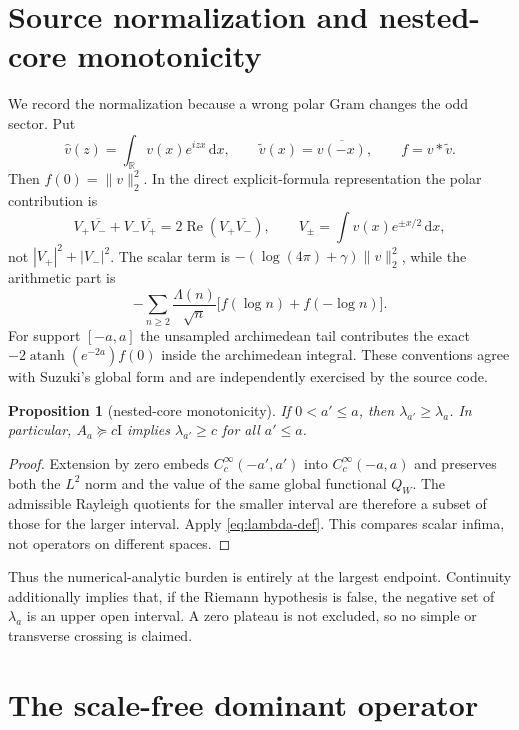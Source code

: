 \documentclass[10pt]{article}
\newtheorem{proposition}[theorem]{Proposition}
\newcommand{\R}{\mathbb R}
\newcommand{\dd}{\,\mathrm d}
\newcommand{\Id}{\mathrm I}
\begin{document}
\section{Source normalization and nested-core monotonicity}

We record the normalization because a wrong polar Gram changes the odd sector.
Put
\[
 \widehat v(z)=\int_\R v(x)e^{izx}\dd x,
 \qquad \widetilde v(x)=\overline{v(-x)},
 \qquad f=v*\widetilde v.
\]
Then $f(0)=\|v\|_2^2$.  In the direct explicit-formula representation the
polar contribution is
\begin{equation}\label{eq:polar}
 V_+\overline{V_-}+V_-\overline{V_+}
 =2\operatorname{Re}(V_+\overline{V_-}),
 \qquad V_\pm=\int v(x)e^{\pm x/2}\dd x,
\end{equation}
not $|V_+|^2+|V_-|^2$.  The scalar term is
$-(\log(4\pi)+\gamma)\|v\|_2^2$, while the arithmetic part is
\begin{equation}\label{eq:prime}
 -\sum_{n\ge2}\frac{\Lambda(n)}{\sqrt n}
   \bigl[f(\log n)+f(-\log n)\bigr].
\end{equation}
For support $[-a,a]$ the unsampled archimedean tail contributes the exact
$-2\operatorname{atanh}(e^{-2a})f(0)$ inside the archimedean integral.  These
conventions agree with Suzuki's global form and are independently exercised by
the source code.

\begin{proposition}[nested-core monotonicity]\label{prop:monotone}
If $0<a'\le a$, then $\lambda_{a'}\ge\lambda_a$.  In particular,
$A_a\succeq c\Id$ implies $\lambda_{a'}\ge c$ for all $a'\le a$.
\end{proposition}
\begin{proof}
Extension by zero embeds $C_c^\infty(-a',a')$ into
$C_c^\infty(-a,a)$ and preserves both the $L^2$ norm and the value of the
same global functional $Q_W$.  The admissible Rayleigh quotients for the
smaller interval are therefore a subset of those for the larger interval.
Apply \eqref{eq:lambda-def}.  This compares scalar infima, not operators on
different spaces.
\end{proof}

Thus the numerical-analytic burden is entirely at the largest endpoint.
Continuity additionally implies that, if the Riemann hypothesis is false, the
negative set of $\lambda_a$ is an upper open interval.  A zero plateau is not
excluded, so no simple or transverse crossing is claimed.

\section{The scale-free dominant operator}
\end{document}
